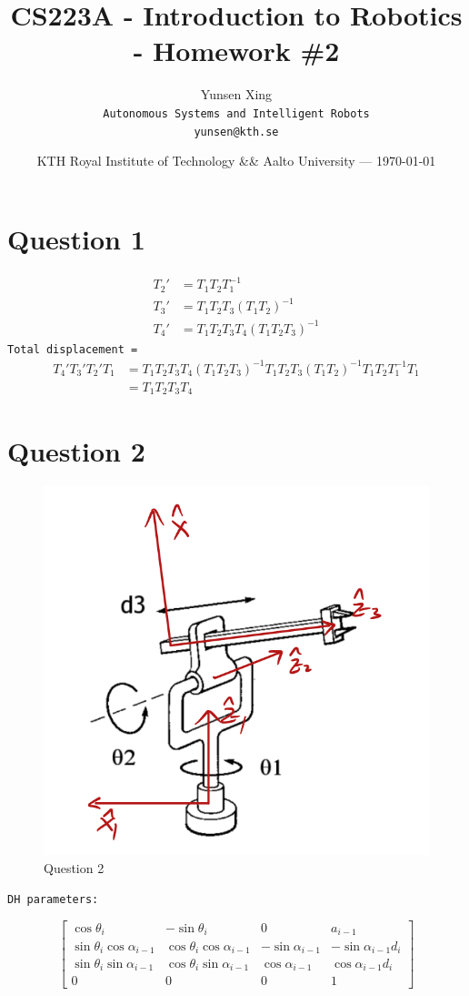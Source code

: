 \documentclass{article}
\title{CS223A - Introduction to Robotics - Homework \#2} %
\author{Yunsen Xing \\
\texttt{Autonomous Systems and Intelligent Robots} \\
\texttt{yunsen@kth.se}} %
\date{KTH Royal Institute of Technology \&\& Aalto University --- \today}
\begin{document}
\maketitle %


\section*{Question 1}
\begin{enumerate}
    \begin{align*}
        T_{2}' &= T_{1}T_{2}T_{1}^{-1} \\
        T_{3}' &= T_{1}T_{2}T_{3}(T_{1}T_{2})^{-1} \\
        T_{4}' &= T_{1}T_{2}T_{3}T_{4}(T_{1}T_{2}T_{3})^{-1}
    \end{align*}
    \texttt{Total displacement = }
    \begin{align*}
        T_{4}'T_{3}'T_{2}'T_{1} &= T_{1}T_{2}T_{3}T_{4}(T_{1}T_{2}T_{3})^{-1}T_{1}T_{2}T_{3}(T_{1}T_2)^{-1}T_{1}T_{2}T_{1}^{-1}T_{1} \\
        &=
        T_{1}T_{2}T_{3}T_{4}
    \end{align*}
\end{enumerate}

\section*{Question 2}
\begin{figure}
    \centering
    \includegraphics[width=0.4\linewidth]{picture/Question2.png}
    \caption{Question 2}
    \label{fig:placeholder}
\end{figure}

\texttt{DH parameters:}
\begin{enumerate}
    \[
        \begin{bmatrix}
            \cos{\theta_{i}} & -\sin{\theta_{i}} & 0 & a_{i-1} \\
            \sin{\theta_{i}}\cos{\alpha_{i-1}} & \cos{\theta_{i}}\cos{\alpha_{i-1}} & -\sin{\alpha_{i-1}} & -\sin{\alpha_{i-1}}d_{i} \\
            \sin{\theta_{i}\sin{\alpha_{i-1}}} & \cos{\theta_{i}\sin{\alpha_{i-1}}} & \cos{\alpha_{i-1}} & \cos{\alpha_{i-1}}d_{i} \\
            0 & 0 & 0 & 1
        \end{bmatrix}
    \]
\end{enumerate}
\end{document}
